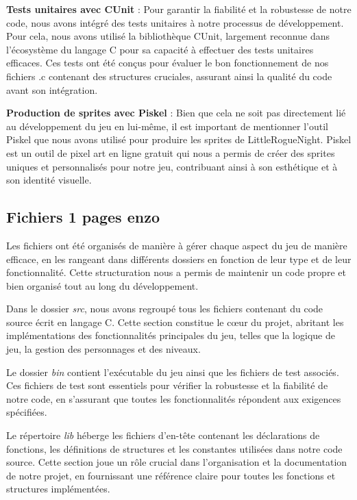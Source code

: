 \documentclass[10pt]{article}
\begin{document}
\textbf{Tests unitaires avec CUnit} :
Pour garantir la fiabilité et la robustesse de notre code, nous avons intégré des tests unitaires à notre processus de développement. Pour cela, nous avons utilisé la bibliothèque CUnit, largement reconnue dans l'écosystème du langage C pour sa capacité à effectuer des tests unitaires efficaces. Ces tests ont été conçus pour évaluer le bon fonctionnement de nos fichiers .c contenant des structures cruciales, assurant ainsi la qualité du code avant son intégration.

\textbf{Production de sprites avec Piskel} :
Bien que cela ne soit pas directement lié au développement du jeu en lui-même, il est important de mentionner l'outil Piskel que nous avons utilisé pour produire les sprites de LittleRogueNight. Piskel est un outil de pixel art en ligne gratuit qui nous a permis de créer des sprites uniques et personnalisés pour notre jeu, contribuant ainsi à son esthétique et à son identité visuelle.

\subsection{Fichiers 1 pages enzo}

Les fichiers ont été organisés de manière à gérer chaque aspect du jeu de manière efficace, en les rangeant dans différents dossiers en fonction de leur type et de leur fonctionnalité. Cette structuration nous a permis de maintenir un code propre et bien organisé tout au long du développement.

Dans le dossier \textit{src}, nous avons regroupé tous les fichiers contenant du code source écrit en langage C. Cette section constitue le cœur du projet, abritant les implémentations des fonctionnalités principales du jeu, telles que la logique de jeu, la gestion des personnages et des niveaux.

Le dossier \textit{bin} contient l'exécutable du jeu ainsi que les fichiers de test associés. Ces fichiers de test sont essentiels pour vérifier la robustesse et la fiabilité de notre code, en s'assurant que toutes les fonctionnalités répondent aux exigences spécifiées.

Le répertoire \textit{lib} héberge les fichiers d'en-tête contenant les déclarations de fonctions, les définitions de structures et les constantes utilisées dans notre code source. Cette section joue un rôle crucial dans l'organisation et la documentation de notre projet, en fournissant une référence claire pour toutes les fonctions et structures implémentées.
\end{document}
